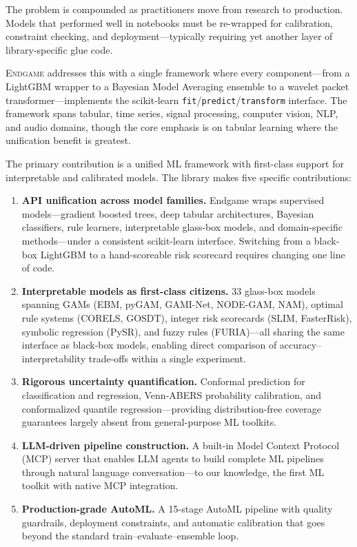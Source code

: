 \documentclass[11pt]{article}
\begin{document}
The problem is compounded as practitioners move from research to production.
Models that performed well in notebooks must be re-wrapped for calibration,
constraint checking, and deployment---typically requiring yet another layer
of library-specific glue code.

\textsc{Endgame} addresses this with a single framework where every
component---from a LightGBM wrapper to a Bayesian Model Averaging ensemble
to a wavelet packet transformer---implements the scikit-learn
\texttt{fit}/\texttt{predict}/\texttt{transform} interface. The framework
spans tabular, time series, signal processing, computer vision, NLP, and
audio domains, though the core emphasis is on tabular learning where the
unification benefit is greatest.

The primary contribution is a unified ML framework with first-class support
for interpretable and calibrated models. The library makes five specific
contributions:

\begin{enumerate}
\item \textbf{API unification across model families.} Endgame wraps
  supervised models---gradient boosted trees, deep tabular architectures,
  Bayesian classifiers, rule learners, interpretable glass-box models, and
  domain-specific methods---under a consistent scikit-learn interface.
  Switching from a black-box LightGBM to a hand-scoreable risk scorecard
  requires changing one line of code.

\item \textbf{Interpretable models as first-class citizens.} 33 glass-box
  models spanning GAMs (EBM, pyGAM, GAMI-Net, NODE-GAM, NAM), optimal rule
  systems (CORELS, GOSDT), integer risk scorecards (SLIM, FasterRisk),
  symbolic regression (PySR), and fuzzy rules (FURIA)---all sharing the
  same interface as black-box models, enabling direct comparison of
  accuracy--interpretability trade-offs within a single experiment.

\item \textbf{Rigorous uncertainty quantification.} Conformal prediction
  for classification and regression, Venn-ABERS probability calibration,
  and conformalized quantile regression---providing distribution-free
  coverage guarantees largely absent from general-purpose ML toolkits.

\item \textbf{LLM-driven pipeline construction.} A built-in Model Context
  Protocol (MCP) server \citep{anthropic2024mcp} that enables LLM agents to
  build complete ML pipelines through natural language conversation---to our
  knowledge, the first ML toolkit with native MCP integration.

\item \textbf{Production-grade AutoML.} A 15-stage AutoML pipeline with
  quality guardrails, deployment constraints, and automatic calibration
  that goes beyond the standard train--evaluate--ensemble loop.
\end{enumerate}
\end{document}
